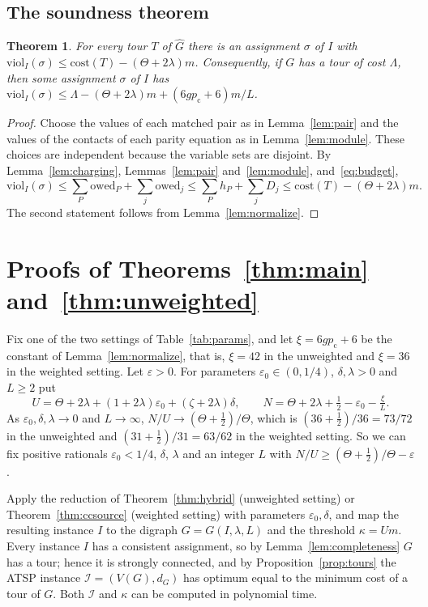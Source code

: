 \documentclass[11pt]{amsart}
\newtheorem{theorem}{Theorem}[section]
\theoremstyle{definition}
\theoremstyle{remark}
\numberwithin{equation}{section}
\newcommand{\eps}{\varepsilon}
\newcommand{\cost}{\mathrm{cost}}
\newcommand{\owed}{\mathrm{owed}}
\newcommand{\viol}{\mathrm{viol}}
\newcommand{\pc}{p_{\mathrm{c}}}
\newcommand{\Gh}{\widehat{G}}
\begin{document}
\subsection{The soundness theorem}

\begin{theorem}\label{thm:soundness}
For every tour $T$ of $\Gh$ there is an assignment $\sigma$ of $I$ with $\viol_I(\sigma)\le\cost(T)-(\Theta+2\lambda)m$. Consequently, if $G$ has a tour of cost $\Lambda$, then some assignment $\sigma$ of $I$ has $\viol_I(\sigma)\le\Lambda-(\Theta+2\lambda)m+(6g\pc+6)m/L$.
\end{theorem}

\begin{proof}
Choose the values of each matched pair as in Lemma~\ref{lem:pair} and the values of the contacts of each parity equation as in Lemma~\ref{lem:module}. These choices are independent because the variable sets are disjoint. By Lemma~\ref{lem:charging}, Lemmas~\ref{lem:pair} and~\ref{lem:module}, and~\eqref{eq:budget},
\[
\viol_I(\sigma)\le\sum_P\owed_P+\sum_j\owed_j\le\sum_Ph_P+\sum_jD_j\le\cost(T)-(\Theta+2\lambda)m .
\]
The second statement follows from Lemma~\ref{lem:normalize}.
\end{proof}

\section{Proofs of Theorems~\ref{thm:main} and~\ref{thm:unweighted}}\label{sec:proofmain}

Fix one of the two settings of Table~\ref{tab:params}, and let $\xi=6g\pc+6$ be the constant of Lemma~\ref{lem:normalize}, that is, $\xi=42$ in the unweighted and $\xi=36$ in the weighted setting. Let $\eps>0$. For parameters $\eps_0\in(0,1/4)$, $\delta,\lambda>0$ and $L\ge2$ put
\[
U=\Theta+2\lambda+(1+2\lambda)\eps_0+(\zeta+2\lambda)\delta,\qquad N=\Theta+2\lambda+\tfrac12-\eps_0-\tfrac{\xi}{L}.
\]
As $\eps_0,\delta,\lambda\to0$ and $L\to\infty$, $N/U\to(\Theta+\frac12)/\Theta$, which is $(36+\frac12)/36=73/72$ in the unweighted and $(31+\frac12)/31=63/62$ in the weighted setting. So we can fix positive rationals $\eps_0<1/4$, $\delta$, $\lambda$ and an integer $L$ with $N/U\ge(\Theta+\frac12)/\Theta-\eps$.

Apply the reduction of Theorem~\ref{thm:hybrid} (unweighted setting) or Theorem~\ref{thm:ccsource} (weighted setting) with parameters $\eps_0,\delta$, and map the resulting instance $I$ to the digraph $G=G(I,\lambda,L)$ and the threshold $\kappa=Um$. Every instance $I$ has a consistent assignment, so by Lemma~\ref{lem:completeness} $G$ has a tour; hence it is strongly connected, and by Proposition~\ref{prop:tours} the ATSP instance $\mathcal{I}=(V(G),d_G)$ has optimum equal to the minimum cost of a tour of $G$. Both $\mathcal I$ and $\kappa$ can be computed in polynomial time.
\end{document}

